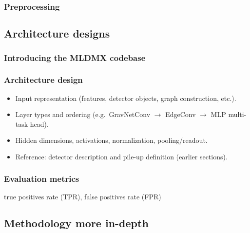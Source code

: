 \subsubsection{Preprocessing}


\subsection{Architecture designs}

\subsubsection{Introducing the MLDMX codebase}

\subsubsection{Architecture design }

\begin{itemize}
    \item Input representation (features, detector objects, graph construction, etc.).
    \item Layer types and ordering (e.g.\ GravNetConv $\rightarrow$ EdgeConv $\rightarrow$ MLP multi-task head).
    \item Hidden dimensions, activations, normalization, pooling/readout.
    \item Reference: detector description and pile-up definition (earlier sections).
\end{itemize}

\subsubsection{Evaluation metrics}

true positives rate (TPR), false positives rate (FPR)



\subsection{Methodology more in-depth}

